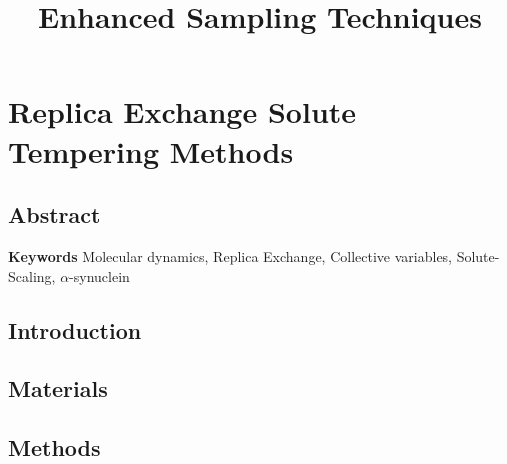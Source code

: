 \documentclass{memoir}
\title{Enhanced Sampling Techniques}
\begin{document}
\date{}

\maketitle

\tableofcontents

\chapter{Replica Exchange Solute Tempering Methods}

\section{Abstract}


\textbf{Keywords} Molecular dynamics, Replica Exchange, Collective variables, Solute-Scaling, $\alpha$-synuclein

\section{Introduction}

\begin{adjustwidth}{2in}{0in}
    




\end{adjustwidth}

\section{Materials}
\begin{adjustwidth}{2in}{0in}

\end{adjustwidth}
\section{Methods}
\begin{adjustwidth}{2in}{0in}

\begin{adjustwidth}{2in}{0in}

\end{adjustwidth}

\end{adjustwidth}


\end{document}
